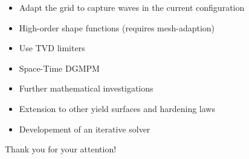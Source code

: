 \documentclass[11pt,aspectratio=169]{beamer}
\begin{document}
\begin{frame}[standout]{}
  \begin{footnotesize}
    \begin{block}{}
      \begin{itemize}
      \item[] Adapt the grid to capture waves in the current configuration
      \item[] High-order shape functions (requires mesh-adaption)
      \item[] Use TVD limiters
      \item[] Space-Time DGMPM
      \end{itemize}
    \end{block}

    
    \begin{block}{}
      \begin{itemize}
      \item[] Further mathematical investigations
      \item[] Extension to other yield surfaces and hardening laws
      \item[] Developement of an iterative solver
      \end{itemize}
    \end{block}
  \end{footnotesize}
\end{frame}

\begin{frame}[standout]{}
  Thank you for your attention!
\end{frame}
  
\end{document}
